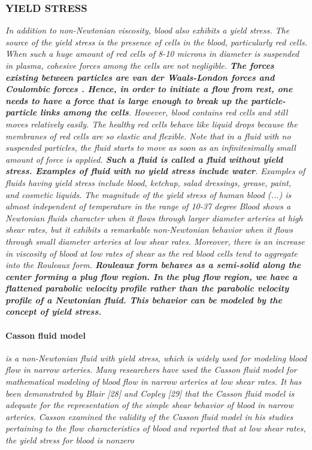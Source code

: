 \documentclass[11pt,letterpaper]{article}
\begin{document}
\subsubsection*{YIELD STRESS} \textit{In addition to non-Newtonian viscosity, blood also exhibits a yield stress. The source
of the yield stress is the presence of cells in the blood, particularly red cells. When such a huge amount of red cells of 8-10 microns in diameter is suspended in plasma, cohesive forces among the cells are not negligible. \textbf{The forces existing between particles are van der Waals-London forces and Coulombic forces . Hence, in order to initiate a flow from rest, one needs to have a force that is large enough to break up the particle-particle links among the cells}. However, blood contains red cells and still moves relatively easily. The healthy red cells behave like liquid drops because the membranes of red cells are so elastic and flexible. Note that in a fluid with no suspended particles, the fluid starts to move as soon as an infinitesimally small amount of force is applied. \textbf{Such a fluid is called a fluid without yield stress. Examples of fluid with no yield stress include water}. Examples of fluids having yield stress include blood, ketchup, salad dressings, grease, paint, and cosmetic liquids.} \newline\newline
\textit{The magnitude of the yield stress of human blood (...) is almost independent of temperature in the range of 10-37 degree} \newline\newline
\textit{Blood shows a Newtonian fluids character when it flows through larger diameter arteries at high shear rates, but it exhibits a remarkable non-Newtonian behavior when it flows through small diameter arteries at low shear rates. Moreover, there is an increase in viscosity of blood at low rates of shear as the red blood cells tend to aggregate into the Rouleaux form. \textbf{Rouleaux form behaves as a semi-solid along the center forming a plug flow region. In the plug flow region, we have a flattened parabolic velocity profile rather than the parabolic velocity profile of a Newtonian fluid. This behavior can be modeled by the concept of yield stress.} } 



\paragraph{\color{red}Casson fluid model} \textit{is a non-Newtonian fluid with yield stress, which is widely used for modeling blood flow in narrow arteries. Many researchers have used the Casson fluid model for mathematical modeling of blood flow in narrow arteries at low shear rates. It has been demonstrated by Blair [28] and Copley [29] that the Casson fluid model is adequate for the representation of the simple shear behavior of blood in narrow arteries. Casson examined the validity of the Casson fluid model in his studies pertaining to the flow characteristics of blood and reported that at low shear rates, the yield stress for blood is nonzero}
\end{document}
